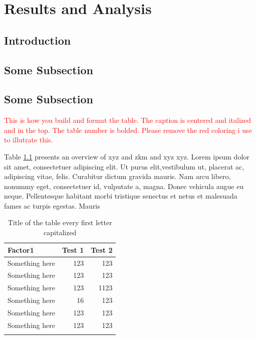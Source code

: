 \chapter{Results and Analysis}
\section{Introduction}
\lipsum[1]
 
\section{Some Subsection}
 
\lipsum[1]
\section{Some Subsection}
\lipsum[1]

\textcolor{red}{This is how you build and format the table. The caption is centered and italized and in the top. The table number is bolded. Please remove the red coloring i use to illutrate this.}

Table \ref{tab:stat_summary} presents an overview of xyz  and zkm and xyz xyz. Lorem ipsum dolor sit amet, consectetuer adipiscing elit. Ut purus elit,vestibulum ut, placerat ac, adipiscing vitae, felis. Curabitur dictum gravida mauris. Nam arcu libero, nonummy eget, consectetuer id, vulputate a,
magna. Donec vehicula augue eu neque. Pellentesque habitant morbi
tristique senectus et netus et malesuada fames ac turpis egestas. Mauris

 

\begin{table}[H]
\centering
{}
\caption{Title of the table every first letter capitalized}
\label{tab:stat_summary}
\begin{tabular}{lrr}
\toprule
Factor1                                      & \multicolumn{1}{c}{Test 1} & \multicolumn{1}{c}{Test 2}   \\
\midrule
Something here    & 123         & 123    \\
Something here    & 123          & 123   \\
Something here    & 123          & 1123  \\
Something here    & 16          & 123    \\
Something here    & 123        & 123     \\
Something here    & 123        & 123    \\
       \\
\bottomrule
\end{tabular}
\end{table}

